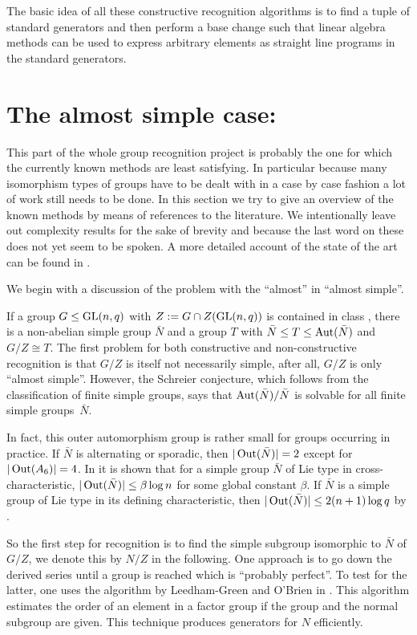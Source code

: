 The basic idea of all these constructive recognition algorithms is to find
a tuple of standard generators and then perform a base change
such that linear algebra methods can be used to express arbitrary
elements as straight line programs in the standard generators.


\section{The almost simple case: }
\label{solveD9}
%

This part of the whole group recognition project is probably the one
for which the currently known methods are least satisfying. In particular
because many isomorphism types of groups have to be dealt with in a case by
case fashion a lot of work still needs to be done.
In this section we try to give an overview of the known methods by
means of references to the literature. We intentionally leave out
complexity results for the sake of brevity and because the last word on
these does not yet seem to be spoken. A more detailed account of
the state of the art can be found in \cite{towards}.

We begin with a discussion of the problem with the ``almost'' in
``almost simple''.

If a group $G \le \GL(n,q)$ with $Z := G \cap Z(\GL(n,q))$ 
is contained in class , there is a
non-abelian simple group $\bar N$ and a group $T$ with $\bar N
\leq T \leq \Aut(\bar N)$ and $G/Z \cong T$. The first problem for
both constructive and non-constructive recognition is that $G/Z$ is
itself not necessarily simple, after all, $G/Z$ is only ``almost simple''.
However, the Schreier conjecture, which follows from the classification
of finite simple groups, says that $\Aut(\bar N) / \bar N$ is solvable
for all finite simple groups~$\bar N$. 

In fact, this outer automorphism
group is rather small for groups occurring in practice. 
If $\bar N$ is alternating or sporadic, then
$|\Out(\bar N)| = 2$ except for $|\Out(A_6)| = 4$.
In \cite[Lemma 1.4]{LucchiniMorigi} it is shown
that for a simple group $\bar N$ of Lie type in cross-characteristic, 
$|\Out(\bar N)| \le \beta \log n$ for some global constant
$\beta$. If $\bar N$ is a simple group of Lie type in its defining
characteristic, then $|\Out(\bar N)| \le 2(n+1)\log q$ by
\cite[Proof of Lemma 1.3]{LucchiniMorigi}.

So the first step for recognition is to find the simple subgroup
isomorphic to $\bar N$ of $G/Z$, we denote this by $N/Z$ in the following. 
One approach is to go down the derived series
until a group is reached which is ``probably perfect''. To test for
the latter, one uses the algorithm by Leedham-Green and O'Brien in
\cite[5.3]{RecogTensInd}. This algorithm estimates the order of an element in a
factor group if the group and the normal subgroup are given.
This technique produces generators for $N$ efficiently.

